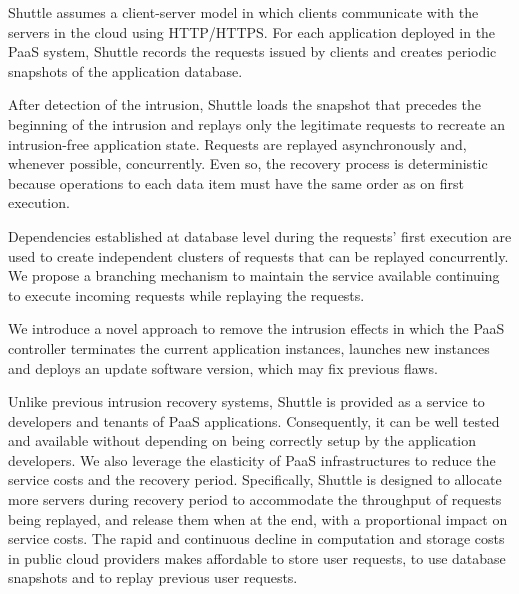 Shuttle assumes a client-server model in which clients communicate with the servers in the cloud using \ac{HTTP}/\ac{HTTPS}. For each application deployed in the \ac{PaaS} system, Shuttle records the requests issued by clients and creates periodic snapshots of the application database. 

After detection of the intrusion, Shuttle loads the snapshot that precedes the beginning of the intrusion and replays only the legitimate requests to recreate an intrusion-free application state. Requests are replayed asynchronously and, whenever possible, concurrently. Even so, the recovery process is deterministic because operations to each data item must have the same order as on first execution. 

Dependencies established at database level during the requests' first execution are used to create independent clusters of requests that can be replayed concurrently. We propose a branching mechanism to maintain the service available continuing to execute incoming requests while replaying the requests. 

We introduce a novel approach to remove the intrusion effects in which the \ac{PaaS} controller terminates the current application instances, launches new instances and deploys an update software version, which may fix previous flaws.



Unlike previous intrusion recovery systems, Shuttle is provided as a service to developers and tenants of \ac{PaaS} applications. Consequently, it can be well tested and available without depending on being correctly setup by the application developers. We also leverage the elasticity of \ac{PaaS} infrastructures to reduce the service costs and the recovery period. Specifically, Shuttle is designed to allocate more servers during recovery period to accommodate the throughput of requests being replayed, and release them when at the end, with a proportional impact on service costs. The rapid and continuous decline in computation and storage costs in public cloud providers makes affordable to store user requests, to use database snapshots and to replay previous user requests.

